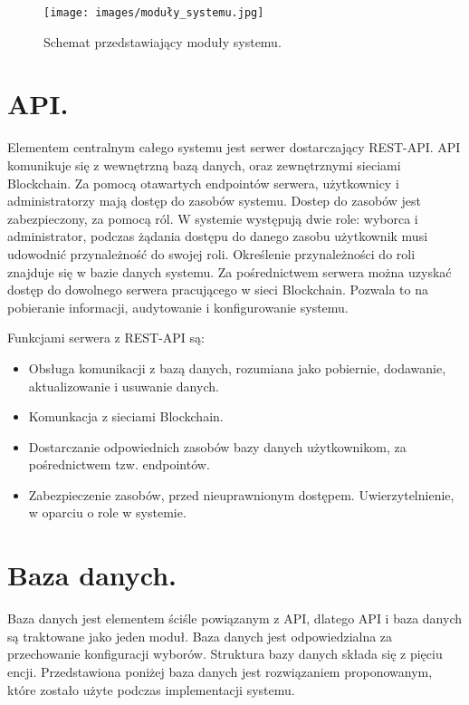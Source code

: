 \documentclass[a4paper,13pt]{report}
\begin{document}
\begin{figure}[h]
    \centering
    \texttt{[image: images/moduły\_systemu.jpg]}
    \caption{Schemat przedstawiający moduły systemu.}
\end{figure}

\newpage

\section{API.}

Elementem centralnym całego systemu jest serwer dostarczający REST-API. API komunikuje się z wewnętrzną bazą danych, oraz zewnętrznymi sieciami Blockchain. Za pomocą otawartych endpointów serwera, użytkownicy i administratorzy mają dostęp do zasobów systemu. Dostep do zasobów jest zabezpieczony, za pomocą ról. W systemie występują dwie role: wyborca i administrator, podczas  żądania dostępu do danego zasobu użytkownik musi udowodnić przynależność do swojej roli. Określenie przynależności do roli znajduje się w bazie danych systemu. Za pośrednictwem serwera można uzyskać dostęp do dowolnego serwera pracującego w sieci Blockchain. Pozwala to na pobieranie informacji, audytowanie i konfigurowanie systemu.

Funkcjami serwera z REST-API są:
\begin{itemize}
	\item Obsługa komunikacji z bazą danych, rozumiana jako pobiernie, dodawanie, aktualizowanie i usuwanie danych.
	\item Komunkacja z sieciami Blockchain.
	\item Dostarczanie odpowiednich zasobów bazy danych użytkownikom, za pośrednictwem tzw. endpointów.
	\item Zabezpieczenie zasobów, przed nieuprawnionym dostępem. Uwierzytelnienie, w oparciu o role w systemie.
\end{itemize}

\section{Baza danych.}
Baza danych jest elementem ściśle powiązanym z API, dlatego API i baza danych są traktowane jako jeden moduł. Baza danych jest odpowiedzialna za przechowanie konfiguracji wyborów. Struktura bazy danych składa się z pięciu encji. Przedstawiona poniżej baza danych jest rozwiązaniem proponowanym, które zostało użyte podczas implementacji systemu.
\end{document}
